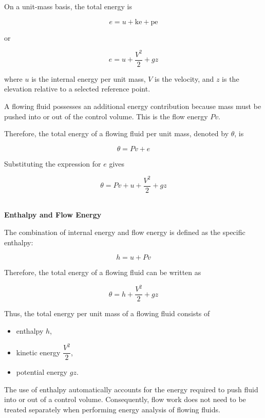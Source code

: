 \documentclass[12pt]{article}
\begin{document}
On a unit-mass basis, the total energy is

\begin{equation*}
e=u+\mathrm{ke}+\mathrm{pe}
\end{equation*}

or

\begin{equation*}
e=u+\frac{V^2}{2}+gz
\end{equation*}

where $u$ is the internal energy per unit mass, $V$ is the velocity, and $z$ is the elevation relative to a selected reference point.

A flowing fluid possesses an additional energy contribution because mass must be pushed into or out of the control volume. This is the flow energy $Pv$.

Therefore, the total energy of a flowing fluid per unit mass, denoted by $\theta$, is

\begin{equation*}
\theta=Pv+e
\end{equation*}

Substituting the expression for $e$ gives

\begin{equation*}
\theta
=
Pv+u+\frac{V^2}{2}+gz
\end{equation*}

\textbf{\\ Enthalpy and Flow Energy}

The combination of internal energy and flow energy is defined as the specific enthalpy:

\begin{equation*}
h=u+Pv
\end{equation*}

Therefore, the total energy of a flowing fluid can be written as

\begin{equation*}
\theta
=
h+\frac{V^2}{2}+gz
\end{equation*}

Thus, the total energy per unit mass of a flowing fluid consists of

\begin{itemize}
    \item enthalpy $h$,
    \item kinetic energy $\dfrac{V^2}{2}$,
    \item potential energy $gz$.
\end{itemize}

The use of enthalpy automatically accounts for the energy required to push fluid into or out of a control volume. Consequently, flow work does not need to be treated separately when performing energy analysis of flowing fluids.
\end{document}
